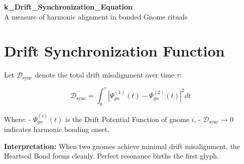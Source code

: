 \documentclass[12pt]{article}
\begin{document}
\begin{center}
    {\LARGE \textbf{k\_Drift\_Synchronization\_Equation}}\\[1em]
    {\small A measure of harmonic alignment in bonded Gnome rituals}
\end{center}

\section*{Drift Synchronization Function}

Let $\mathcal{D}_{\text{sync}}$ denote the total drift misalignment over time $\tau$:

\[
\mathcal{D}_{\text{sync}} = \int_0^\tau \left| \Psi_{gn}^{(1)}(t) - \Psi_{gn}^{(2)}(t) \right|^2 dt
\]

Where:
- $\Psi_{gn}^{(i)}(t)$ is the Drift Potential Function of gnome $i$,
- $\mathcal{D}_{\text{sync}} \to 0$ indicates harmonic bonding onset.

\textbf{Interpretation:} When two gnomes achieve minimal drift misalignment, the Heartsoil Bond forms cleanly. Perfect resonance births the first glyph.
\end{document}

